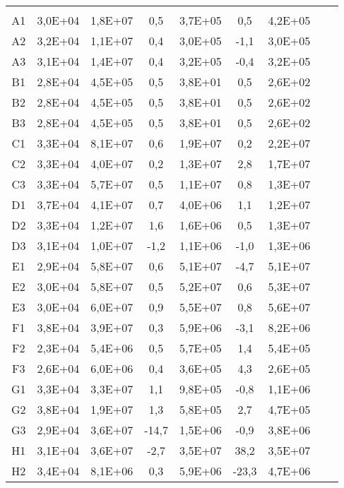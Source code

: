 \begin{center}
\begin{longtable}{ccccccccc}
\toprule
\endhead
\midrule \\ %
\endfoot
\bottomrule 
\endlastfoot
A1    & 3,0E+04 & 1,8E+07 & 0,5   & 3,7E+05 & 0,5   & 4,2E+05 \\
A2    & 3,2E+04 & 1,1E+07 & 0,4   & 3,0E+05 & -1,1  & 3,0E+05 \\
A3    & 3,1E+04 & 1,4E+07 & 0,4   & 3,2E+05 & -0,4  & 3,2E+05 \\
B1    & 2,8E+04 & 4,5E+05 & 0,5   & 3,8E+01 & 0,5   & 2,6E+02 \\
B2    & 2,8E+04 & 4,5E+05 & 0,5   & 3,8E+01 & 0,5   & 2,6E+02 \\
B3    & 2,8E+04 & 4,5E+05 & 0,5   & 3,8E+01 & 0,5   & 2,6E+02 \\
C1    & 3,3E+04 & 8,1E+07 & 0,6   & 1,9E+07 & 0,2   & 2,2E+07 \\
C2    & 3,3E+04 & 4,0E+07 & 0,2   & 1,3E+07 & 2,8   & 1,7E+07 \\
C3    & 3,3E+04 & 5,7E+07 & 0,5   & 1,1E+07 & 0,8   & 1,3E+07 \\
D1    & 3,7E+04 & 4,1E+07 & 0,7   & 4,0E+06 & 1,1   & 1,2E+07 \\
D2    & 3,3E+04 & 1,2E+07 & 1,6   & 1,6E+06 & 0,5   & 1,3E+07 \\
D3    & 3,1E+04 & 1,0E+07 & -1,2  & 1,1E+06 & -1,0  & 1,3E+06 \\
E1    & 2,9E+04 & 5,8E+07 & 0,6   & 5,1E+07 & -4,7  & 5,1E+07 \\
E2    & 3,0E+04 & 5,8E+07 & 0,5   & 5,2E+07 & 0,6   & 5,3E+07 \\
E3    & 3,0E+04 & 6,0E+07 & 0,9   & 5,5E+07 & 0,8   & 5,6E+07 \\
F1    & 3,8E+04 & 3,9E+07 & 0,3   & 5,9E+06 & -3,1  & 8,2E+06 \\
F2    & 2,3E+04 & 5,4E+06 & 0,5   & 5,7E+05 & 1,4   & 5,4E+05 \\
F3    & 2,6E+04 & 6,0E+06 & 0,4   & 3,6E+05 & 4,3   & 2,6E+05 \\
G1    & 3,3E+04 & 3,3E+07 & 1,1   & 9,8E+05 & -0,8  & 1,1E+06 \\
G2    & 3,8E+04 & 1,9E+07 & 1,3   & 5,8E+05 & 2,7   & 4,7E+05 \\
G3    & 2,9E+04 & 3,6E+07 & -14,7 & 1,5E+06 & -0,9  & 3,8E+06 \\
H1    & 3,1E+04 & 3,6E+07 & -2,7  & 3,5E+07 & 38,2  & 3,5E+07 \\
H2    & 3,4E+04 & 8,1E+06 & 0,3   & 5,9E+06 & -23,3 & 4,7E+06 \\

\end{longtable}
\end{center}

